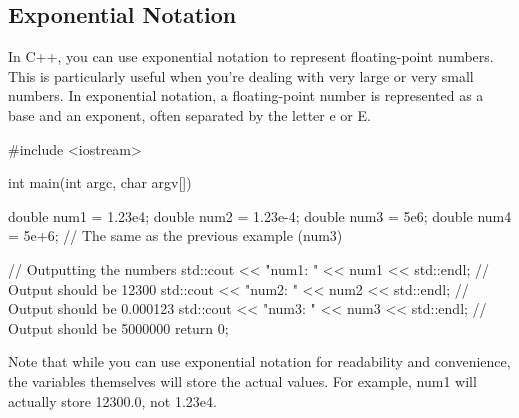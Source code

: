\documentclass{report}
\begin{document}
    \pagebreak \bigbreak \noindent 
    \subsection{Exponential Notation}
    \bigbreak \noindent 
    In C++, you can use exponential notation to represent floating-point numbers. This is particularly useful when you're dealing with very large or very small numbers. In exponential notation, a floating-point number is represented as a base and an exponent, often separated by the letter e or E.
    \bigbreak \noindent 
    
    \begin{cppcode}
#include <iostream>

int main(int argc, char argv[]){
    double num1 = 1.23e4;
    double num2 = 1.23e-4;
    double num3 = 5e6;
    double num4 = 5e+6; // The same as the previous example (num3)

    // Outputting the numbers
    std::cout << "num1: " << num1 << std::endl;  // Output should be 12300
    std::cout << "num2: " << num2 << std::endl;  // Output should be 0.000123
    std::cout << "num3: " << num3 << std::endl;  // Output should be 5000000
    return 0;
}
    \end{cppcode}
    
    \bigbreak \noindent 
    \begin{notebox}
			Note that while you can use exponential notation for readability and convenience, the variables themselves will store the actual values. For example, num1 will actually store 12300.0, not 1.23e4.
		\end{notebox}
    \bigbreak \noindent 
%     
%
%
%
%
%     

    \bigbreak \noindent   
\end{document}
